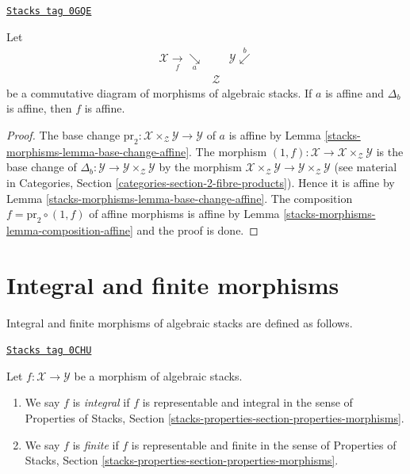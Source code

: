 \begin{lemma}
\label{stacks-morphisms-lemma-affine-permanence}
\href{https://stacks.math.columbia.edu/tag/0GQE}{\texttt{Stacks tag 0GQE}}

Let
$$
\begin{array}{ccc}\mathcal{X} \underset{f}{\longrightarrow}\underset{a}{\searrow} &  & \mathcal{Y} \overset{b}{\swarrow} \\  & \mathcal{Z} & \end{array}
$$
be a commutative diagram of morphisms of algebraic stacks.
If $a$ is affine and $\Delta_b$ is affine, then
$f$ is affine.
\end{lemma}

\begin{proof}
The base change
$\text{pr}_2 : \mathcal{X} \times_\mathcal{Z} \mathcal{Y} \to \mathcal{Y}$
of $a$ is affine by Lemma \ref{stacks-morphisms-lemma-base-change-affine}. The morphism
$(1, f) : \mathcal{X} \to \mathcal{X} \times_\mathcal{Z} \mathcal{Y}$
is the base change of
$\Delta_b : \mathcal{Y} \to \mathcal{Y} \times_\mathcal{Z} \mathcal{Y}$
by the morphism $\mathcal{X} \times_\mathcal{Z} \mathcal{Y} \to
\mathcal{Y} \times_\mathcal{Z} \mathcal{Y}$ (see material in
Categories, Section \ref{categories-section-2-fibre-products}).
Hence it is affine by
Lemma \ref{stacks-morphisms-lemma-base-change-affine}.
The composition $f = \text{pr}_2 \circ (1, f)$ of affine morphisms is affine by
Lemma \ref{stacks-morphisms-lemma-composition-affine} and the proof is done.
\end{proof}

\section{Integral and finite morphisms}
\label{stacks-morphisms-section-integral}
Integral and finite morphisms of algebraic stacks are defined as follows.

\begin{definition}[Integral]
\label{stacks-morphisms-definition-integral}
\href{https://stacks.math.columbia.edu/tag/0CHU}{\texttt{Stacks tag 0CHU}}

Let $f : \mathcal{X} \to \mathcal{Y}$ be a morphism of algebraic stacks.
\begin{enumerate}
\item We say $f$ is {\it integral} if $f$ is representable and integral
in the sense of Properties of Stacks, Section
\ref{stacks-properties-section-properties-morphisms}.
\item We say $f$ is {\it finite} if $f$ is representable and finite
in the sense of Properties of Stacks, Section
\ref{stacks-properties-section-properties-morphisms}.
\end{enumerate}
\end{definition}

